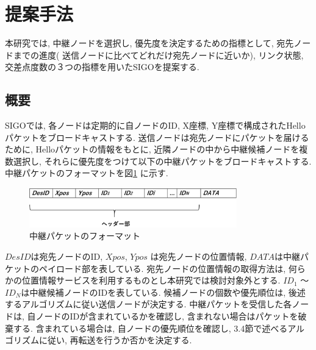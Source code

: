 \documentclass[technicalreport]{ieicej}
\begin{document}
\section{提案手法}
本研究では, 中継ノードを選択し, 優先度を決定するための指標として, 宛先ノードまでの進度( 送信ノードに比べてどれだけ宛先ノードに近いか), リンク状態, 交差点度数の３つの指標を用いたSIGOを提案する. 

\subsection{概要}
SIGOでは, 各ノードは定期的に自ノードのID, X座標, Y座標で構成されたHelloパケットをブロードキャストする. 送信ノードは宛先ノードにパケットを届けるために, Helloパケットの情報をもとに, 近隣ノードの中から中継候補ノードを複数選択し, それらに優先度をつけて以下の中継パケットをブロードキャストする. 中継パケットのフォーマットを図\ref{fig:Packet} に示す.

\begin{figure}[!ht]
\centering
\includegraphics[width=90mm]{figures/Packet.eps}
\caption{中継パケットのフォーマット}
\label{fig:Packet}
\end{figure}

$DesID$は宛先ノードのID, $Xpos$, $Ypos$ は宛先ノードの位置情報, $DATA$は中継パケットのペイロード部を表している. 宛先ノードの位置情報の取得方法は, 何らかの位置情報サービスを利用するものとし本研究では検討対象外とする. $ID_{1}$  ～ $ID_{N}$は中継候補ノードのIDを表している. 候補ノードの個数や優先順位は, 後述するアルゴリズムに従い送信ノードが決定する. 中継パケットを受信した各ノードは, 自ノードのIDが含まれているかを確認し, 含まれない場合はパケットを破棄する. 含まれている場合は, 自ノードの優先順位を確認し, 3.4節で述べるアルゴリズムに従い, 再転送を行うか否かを決定する. 
\end{document}
